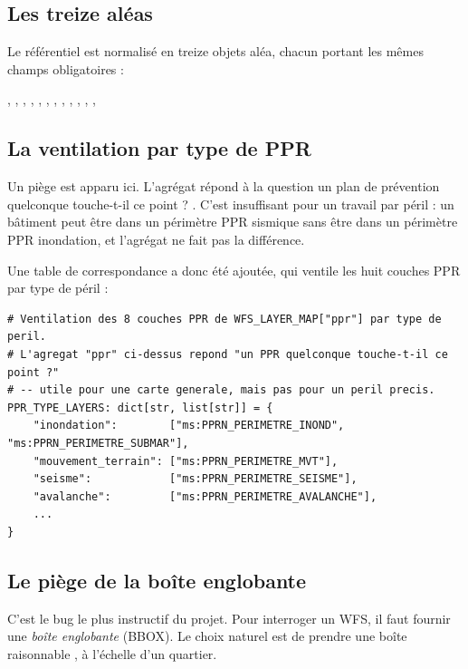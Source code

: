 \subsection{Les treize aléas}

Le référentiel est normalisé en treize objets aléa, chacun portant les mêmes
champs obligatoires :

\begin{center}
\small
{}, , , ,
, , , , ,
, , , 
\end{center}

\subsection{La ventilation par type de PPR}

Un piège est apparu ici. L'agrégat  répond à la question \og un plan
de prévention quelconque touche-t-il ce point ? \fg. C'est insuffisant pour un
travail par péril : un bâtiment peut être dans un périmètre PPR sismique sans
être dans un périmètre PPR inondation, et l'agrégat ne fait pas la différence.

Une table de correspondance a donc été ajoutée, qui ventile les huit couches
PPR par type de péril :

\begin{lstlisting}[caption={Ventilation des couches PPR par type de péril
(\fichier{georisques\_wfs.py}).},label={lst:ppr}]
# Ventilation des 8 couches PPR de WFS_LAYER_MAP["ppr"] par type de peril.
# L'agregat "ppr" ci-dessus repond "un PPR quelconque touche-t-il ce point ?"
# -- utile pour une carte generale, mais pas pour un peril precis.
PPR_TYPE_LAYERS: dict[str, list[str]] = {
    "inondation":        ["ms:PPRN_PERIMETRE_INOND", "ms:PPRN_PERIMETRE_SUBMAR"],
    "mouvement_terrain": ["ms:PPRN_PERIMETRE_MVT"],
    "seisme":            ["ms:PPRN_PERIMETRE_SEISME"],
    "avalanche":         ["ms:PPRN_PERIMETRE_AVALANCHE"],
    ...
}
\end{lstlisting}

\subsection{Le piège de la boîte englobante}

C'est le bug le plus instructif du projet. Pour interroger un WFS, il faut
fournir une \emph{boîte englobante} (BBOX). Le choix naturel est de prendre une
boîte \og raisonnable \fg, à l'échelle d'un quartier.

